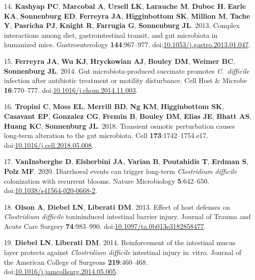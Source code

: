 \documentclass[
  11pt,
]{article}
\begin{document}
\leavevmode\hypertarget{ref-Kashyap2013}{}%
14. \textbf{Kashyap PC}, \textbf{Marcobal A}, \textbf{Ursell LK},
\textbf{Larauche M}, \textbf{Duboc H}, \textbf{Earle KA},
\textbf{Sonnenburg ED}, \textbf{Ferreyra JA}, \textbf{Higginbottom SK},
\textbf{Million M}, \textbf{Tache Y}, \textbf{Pasricha PJ},
\textbf{Knight R}, \textbf{Farrugia G}, \textbf{Sonnenburg JL}. 2013.
Complex interactions among diet, gastrointestinal transit, and gut
microbiota in humanized mice. Gastroenterology \textbf{144}:967--977.
doi:\href{https://doi.org/10.1053/j.gastro.2013.01.047}{10.1053/j.gastro.2013.01.047}.

\leavevmode\hypertarget{ref-Ferreyra2014}{}%
15. \textbf{Ferreyra JA}, \textbf{Wu KJ}, \textbf{Hryckowian AJ},
\textbf{Bouley DM}, \textbf{Weimer BC}, \textbf{Sonnenburg JL}. 2014.
Gut microbiota-produced succinate promotes \emph{C.~difficile} infection
after antibiotic treatment or motility disturbance. Cell Host \& Microbe
\textbf{16}:770--777.
doi:\href{https://doi.org/10.1016/j.chom.2014.11.003}{10.1016/j.chom.2014.11.003}.

\leavevmode\hypertarget{ref-Tropini2018}{}%
16. \textbf{Tropini C}, \textbf{Moss EL}, \textbf{Merrill BD},
\textbf{Ng KM}, \textbf{Higginbottom SK}, \textbf{Casavant EP},
\textbf{Gonzalez CG}, \textbf{Fremin B}, \textbf{Bouley DM},
\textbf{Elias JE}, \textbf{Bhatt AS}, \textbf{Huang KC},
\textbf{Sonnenburg JL}. 2018. Transient osmotic perturbation causes
long-term alteration to the gut microbiota. Cell
\textbf{173}:1742--1754.e17.
doi:\href{https://doi.org/10.1016/j.cell.2018.05.008}{10.1016/j.cell.2018.05.008}.

\leavevmode\hypertarget{ref-VanInsberghe2020}{}%
17. \textbf{VanInsberghe D}, \textbf{Elsherbini JA}, \textbf{Varian B},
\textbf{Poutahidis T}, \textbf{Erdman S}, \textbf{Polz MF}. 2020.
Diarrhoeal events can trigger long-term \emph{Clostridium difficile}
colonization with recurrent blooms. Nature Microbiology
\textbf{5}:642--650.
doi:\href{https://doi.org/10.1038/s41564-020-0668-2}{10.1038/s41564-020-0668-2}.

\leavevmode\hypertarget{ref-Olson2013}{}%
18. \textbf{Olson A}, \textbf{Diebel LN}, \textbf{Liberati DM}. 2013.
Effect of host defenses on \emph{Clostridium difficile} toxininduced
intestinal barrier injury. Journal of Trauma and Acute Care Surgery
\textbf{74}:983--990.
doi:\href{https://doi.org/10.1097/ta.0b013e3182858477}{10.1097/ta.0b013e3182858477}.

\leavevmode\hypertarget{ref-Diebel2014}{}%
19. \textbf{Diebel LN}, \textbf{Liberati DM}. 2014. Reinforcement of the
intestinal mucus layer protects against \emph{Clostridium difficile}
intestinal injury in~vitro. Journal of the American College of Surgeons
\textbf{219}:460--468.
doi:\href{https://doi.org/10.1016/j.jamcollsurg.2014.05.005}{10.1016/j.jamcollsurg.2014.05.005}.
\end{document}
